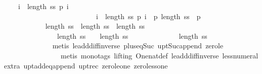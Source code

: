\begin{isabellebody}
\ {\isachardoublequoteopen}{\isachardot}{\isachardot}{\isachardot}\ {\isacharequal}\ {\isacharparenleft}{\isasymSum}\ i\ {\isasymleftarrow}\ {\isacharbrackleft}{}{\isachardot}{\isachardot}{\isacharless}length\ ss{\isacharminus}{}{\isacharbrackright}{\isachardot}\ {\isacharquery}p{}\ i{\isacharparenright}\ {\isacharminus}\isanewline
\ \ \ \ \ \ \ \ \ \ \ \ \ \ \ \ \ \ \ \ \ \ \ \ \ {\isacharparenleft}{\isasymSum}\ i\ {\isasymleftarrow}\ {\isacharbrackleft}{}{\isachardot}{\isachardot}{\isacharless}length\ ss{\isacharbrackright}{\isachardot}\ {\isacharquery}p{}\ i{\isacharparenright}\ {\isacharplus}\ {\isacharparenleft}{\isacharquery}p{}\ {\isacharparenleft}length\ ss{\isacharminus}{}{\isacharparenright}{\isacharparenright}\ {\isacharminus}\ {\isacharparenleft}{\isacharquery}p{}\ {}{\isacharparenright}{\isachardoublequoteclose}\isanewline
\ \ \ \ \ \ \ \ \isamarkupfalse%
{\isacharminus}\isanewline
\ \ \ \ \ \ \ \ \ \ \isamarkupfalse%
\ {\isachardoublequoteopen}{\isacharbrackleft}{}{\isachardot}{\isachardot}{\isacharless}length\ ss{\isacharbrackright}\ {\isacharequal}\ {\isacharbrackleft}{}{\isachardot}{\isachardot}{\isacharless}length\ ss{\isacharminus}{}{\isacharbrackright}\ {\isacharat}\ {\isacharbrackleft}length\ ss\ {\isacharminus}\ {}{\isacharbrackright}{\isachardoublequoteclose}\isanewline
\ \ \ \ \ \ \ \ \ \ \ \ \ \ \ {\isachardoublequoteopen}{\isacharbrackleft}{}{\isachardot}{\isachardot}{\isacharless}length\ ss{\isacharbrackright}\ {\isacharequal}\ {\isacharbrackleft}{}{\isacharbrackright}\ {\isacharat}\ {\isacharbrackleft}{}{\isachardot}{\isachardot}{\isacharless}length\ ss{\isacharbrackright}{\isachardoublequoteclose}\isanewline
\ \ \ \ \ \ \ \ \ \ \ \ \isamarkupfalse%
\ {\isacharbackquoteopen}length\ ss\ {\isasymge}\ {}{\isacharbackquoteclose}\isanewline
\ \ \ \ \ \ \ \ \ \ \ \ \isamarkupfalse%
\ {\isacharparenleft}metis\ le{\isacharunderscore}add{\isacharunderscore}diff{\isacharunderscore}inverse\ plus{\isacharunderscore}{}{\isacharunderscore}eq{\isacharunderscore}Suc\ upt{\isacharunderscore}Suc{\isacharunderscore}append\ zero{\isacharunderscore}le{\isacharcomma}\ \isanewline
\ \ \ \ \ \ \ \ \ \ \ \ \ \ \ \ metis\ {\isacharparenleft}mono{\isacharunderscore}tags{\isacharcomma}\ lifting{\isacharparenright}\ One{\isacharunderscore}nat{\isacharunderscore}def\ le{\isacharunderscore}add{\isacharunderscore}diff{\isacharunderscore}inverse\ less{\isacharunderscore}numeral{\isacharunderscore}extra{\isacharparenleft}{}{\isacharparenright}\ upt{\isacharunderscore}add{\isacharunderscore}eq{\isacharunderscore}append\ upt{\isacharunderscore}rec\ zero{\isacharunderscore}le{\isacharunderscore}one\ zero{\isacharunderscore}less{\isacharunderscore}one{\isacharparenright}\isanewline

\end{isabellebody}
